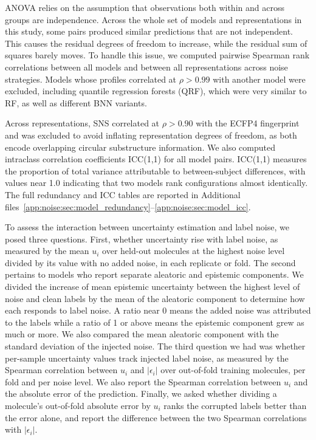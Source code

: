 ANOVA relies on the assumption that observations both within and across groups are independence. Across the whole set of models and representations in this study, some pairs produced similar predictions that are not independent. This causes the residual degrees of freedom to increase, while the residual sum of squares barely moves. To handle this issue, we computed pairwise Spearman rank correlations between all models and between all representations across noise strategies. Models whose profiles correlated at $\rho > 0.99$ with another model were excluded, including quantile regression forests (QRF), which were very similar to RF, as well as different BNN variants. 

Across representations, SNS correlated at $\rho > 0.90$ with the ECFP4 fingerprint and was excluded to avoid inflating representation degrees of freedom, as both encode overlapping circular substructure information. We also computed intraclass correlation coefficients ICC(1,1) for all model pairs. ICC(1,1) measures the proportion of total variance attributable to between-subject differences, with values near 1.0 indicating that two models rank configurations almost identically. The full redundancy and ICC tables are reported in Additional files~\ref{app:noise:sec:model_redundancy}--\ref{app:noise:sec:model_icc}.

To assess the interaction between uncertainty estimation and label noise, we posed three questions. First, whether uncertainty rise with label noise, as measured by the mean $u_i$ over held-out molecules at the highest noise level
divided by its value with no added noise, in each replicate or fold. The second pertains to models who report separate aleatoric and epistemic components. We divided the increase of mean epistemic uncertainty between the highest level of noise and clean labels by the mean of the aleatoric component to determine how each responds to label noise. A ratio near 0 means the added noise was attributed to the labels while a ratio of 1 or above means the epistemic component grew as much or more. We also compared the mean aleatoric component with the standard deviation of the injected noise. The third question we had was whether per-sample uncertainty values track injected label noise, as measured by the Spearman correlation between $u_i$ and $|\epsilon_i|$ over out-of-fold training molecules, per fold and per noise level. We also report the Spearman correlation between $u_i$ and the absolute error of the prediction. Finally, we asked whether dividing a molecule's out-of-fold absolute error by $u_i$ ranks the corrupted labels better than the error alone, and report the difference between the two Spearman correlations with $|\epsilon_i|$.


